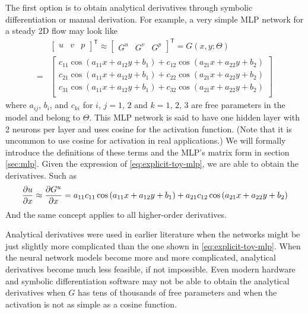 The first option is to obtain analytical derivatives through symbolic differentiation or manual derivation.
For example, a very simple MLP network for a steady 2D flow may look like
\begin{equation}\label{eq:explicit-toy-mlp}
    \begin{aligned}
    &\begin{bmatrix}
        u &
        v &
        p
    \end{bmatrix}^\mathsf{T}
    \approx
    \begin{bmatrix}
        G^u &
        G^v &
        G^p
    \end{bmatrix}^\mathsf{T}
    =
    G(x, y; \Theta) \\
    = 
    &\begin{bmatrix}
    c_{11} \cos{\left(a_{11}x + a_{12}y + b_1\right)} + 
      c_{12} \cos{\left(a_{21}x + a_{22}y + b_2\right)} \\
    c_{21} \cos{\left(a_{11}x + a_{12}y + b_1\right)} + 
      c_{22} \cos{\left(a_{21}x + a_{22}y + b_2\right)} \\
    c_{31} \cos{\left(a_{11}x + a_{12}y + b_1\right)} + 
      c_{32} \cos{\left(a_{21}x + a_{22}y + b_2\right)} \\
    \end{bmatrix}
    \end{aligned}
\end{equation}
where $a_{ij}$, $b_i$, and $c_{ki}$ for $i$, $j=1$, $2$ and $k=1$, $2$, $3$ are free parameters in the model and belong to $\Theta$.
This MLP network is said to have one hidden layer with 2 neurons per layer and uses cosine for the activation function.
(Note that it is uncommon to use cosine for activation in real applications.)
We will formally introduce the definitions of these terms and the MLP's matrix form in section \ref{sec:mlp}.
Given the expression of \eqref{eq:explicit-toy-mlp}, we are able to obtain the derivatives.
Such as
\begin{equation}
    \begin{aligned}
    \frac{\partial u}{\partial x}
    \approx
    \frac{\partial G^u}{\partial x}
    =
    a_{11}c_{11}\cos\left(a_{11}x + a_{12}y + b_1\right) + a_{21}c_{12}\cos\left(a_{21}x + a_{22}y + b_2\right)
    \end{aligned}
\end{equation}
And the same concept applies to all higher-order derivatives.

Analytical derivatives were used in earlier literature when the networks might be just slightly more complicated than the one shown in \eqref{eq:explicit-toy-mlp}.
When the neural network models become more and more complicated, analytical derivatives become much less feasible, if not impossible.
Even modern hardware and symbolic differentiation software may not be able to obtain the analytical derivatives when $G$ has tens of thousands of free parameters and when the activation is not as simple as a cosine function.

